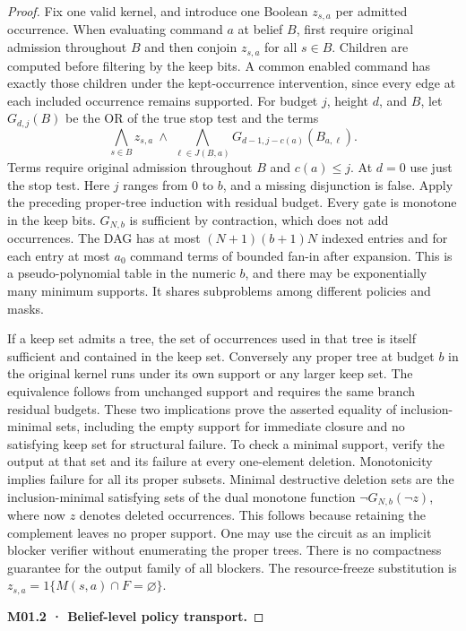 \begin{proof}
Fix one valid kernel, and introduce one Boolean \(z_{s,a}\) per admitted occurrence. When evaluating command \(a\) at belief \(B\), first require original admission throughout \(B\) and then conjoin \(z_{s,a}\) for all \(s\in B\). Children are computed before filtering by the keep bits. A common enabled command has exactly those children under the kept-occurrence intervention, since every edge at each included occurrence remains supported. For budget \(j\), height \(d\), and \(B\), let \(G_{d,j}(B)\) be the OR of the true stop test and the terms
\[
  \bigwedge_{s\in B}z_{s,a}\ \land\
  \bigwedge_{\ell\in J(B,a)}G_{d-1,j-c(a)}(B_{a,\ell}).
\]
Terms require original admission throughout \(B\) and \(c(a)\le j\). At \(d=0\) use just the stop test. Here \(j\) ranges from \(0\) to \(b\), and a missing disjunction is false. Apply the preceding proper-tree induction with residual budget. Every gate is monotone in the keep bits. \(G_{N,b}\) is sufficient by contraction, which does not add occurrences. The DAG has at most \((N+1)(b+1)N\) indexed entries and for each entry at most \(a_0\) command terms of bounded fan-in after expansion. This is a pseudo-polynomial table in the numeric \(b\), and there may be exponentially many minimum supports. It shares subproblems among different policies and masks.

If a keep set admits a tree, the set of occurrences used in that tree is itself sufficient and contained in the keep set. Conversely any proper tree at budget \(b\) in the original kernel runs under its own support or any larger keep set. The equivalence follows from unchanged support and requires the same branch residual budgets. These two implications prove the asserted equality of inclusion-minimal sets, including the empty support for immediate closure and no satisfying keep set for structural failure. To check a minimal support, verify the output at that set and its failure at every one-element deletion. Monotonicity implies failure for all its proper subsets. Minimal destructive deletion sets are the inclusion-minimal satisfying sets of the dual monotone function \(\neg G_{N,b}(\neg z)\), where now \(z\) denotes deleted occurrences. This follows because retaining the complement leaves no proper support. One may use the circuit as an implicit blocker verifier without enumerating the proper trees. There is no compactness guarantee for the output family of all blockers. The resource-freeze substitution is \(z_{s,a}=1\{M(s,a)\cap F=\varnothing\}\).

\textbf{M01.2 · Belief-level policy transport.}


\end{proof}
